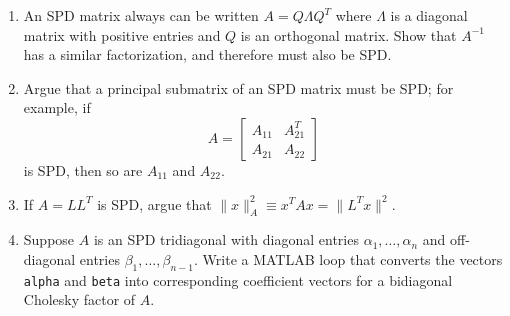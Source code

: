 \documentclass[12pt, leqno]{article}
\begin{document}
\begin{enumerate}
\item
  An SPD matrix always can be written $A = Q \Lambda Q^T$ where
  $\Lambda$ is a diagonal matrix with positive entries and $Q$ is
  an orthogonal matrix.  Show that $A^{-1}$ has a similar
  factorization, and therefore must also be SPD.
\item
  Argue that a principal submatrix of an SPD matrix must be SPD;
  for example, if
  \[
    A = \begin{bmatrix} A_{11} & A_{21}^T \\ A_{21} & A_{22} \end{bmatrix}
  \]
  is SPD, then so are $A_{11}$ and $A_{22}$.
\item
  If $A = LL^T$ is SPD, argue that
  $\|x\|_A^2 \equiv x^T A x = \|L^T x\|^2$.
\item
  Suppose $A$ is an SPD tridiagonal with diagonal entries
  $\alpha_{1}, \ldots, \alpha_n$ and off-diagonal entries
  $\beta_1, \ldots, \beta_{n-1}$.  Write a MATLAB loop that converts
  the vectors {\tt alpha} and {\tt beta} into corresponding
  coefficient vectors for a bidiagonal Cholesky factor of $A$.
\end{enumerate}
\end{document}

